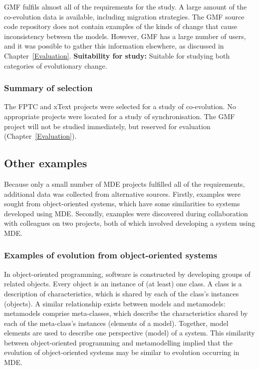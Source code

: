 GMF fulfils almost all of the requirements for the study. A large amount of the co-evolution data is available, including migration strategies. The GMF source code repository does not contain examples of the kinds of change that cause inconsistency between the models. However, GMF has a large number of users, and it was possible to gather this information elsewhere, as discussed in Chapter~\ref{Evaluation}. \textbf{Suitability for study:} Suitable for studying both categories of evolutionary change.

\subsubsection{Summary of selection}
The FPTC and xText projects were selected for a study of co-evolution. No appropriate projects were located for a study of synchronisation. The GMF project will not be studied immediately, but reserved for evaluation (Chapter~\ref{Evaluation}).


\subsection{Other examples}
Because only a small number of MDE projects fulfilled all of the requirements, additional data was collected from alternative sources. Firstly, examples were sought from object-oriented systems, which have some similarities to systems developed using MDE. Secondly, examples were discovered during collaboration with colleagues on two projects, both of which involved developing a system using MDE.

\subsubsection{Examples of evolution from object-oriented systems}
In object-oriented programming, software is constructed by developing groups of related objects. Every object is an instance of (at least) one class. A class is a description of characteristics, which is shared by each of the class's instances (objects). A similar relationship exists between models and metamodels: metamodels comprise meta-classes, which describe the characteristics shared by each of the meta-class's instances (elements of a model). Together, model elements are used to describe one perspective (model) of a system. This similarity between object-oriented programming and metamodelling implied that the evolution of object-oriented systems may be similar to evolution occurring in MDE. 

